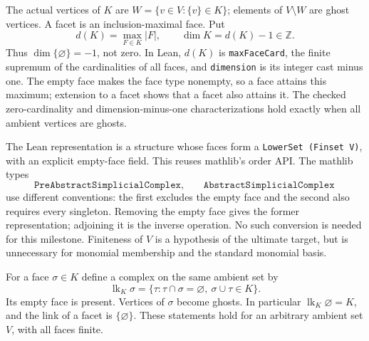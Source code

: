 \begin{definition}\label{def:dimension}
\leanok
The actual vertices of $K$ are
$W=\{v\in V:\{v\}\in K\}$; elements of $V\setminus W$ are ghost vertices.
A facet is an inclusion-maximal face. Put
\[
 d(K)=\max_{F\in K}|F|,\qquad \dim K=d(K)-1\in\mathbb Z.
\]
Thus $\dim\{\varnothing\}=-1$, not zero.
In Lean, $d(K)$ is \texttt{maxFaceCard}, the finite supremum of the
cardinalities of all faces, and \texttt{dimension} is its integer cast
minus one. The empty face makes the face type nonempty, so a face attains
this maximum; extension to a facet shows that a facet also attains it.
The checked zero-cardinality and dimension-minus-one characterizations
hold exactly when all ambient vertices are ghosts.
\end{definition}

The Lean representation is a structure whose faces form a
\texttt{LowerSet (Finset V)}, with an explicit empty-face field. This reuses
mathlib's order API. The mathlib types
\[
\texttt{PreAbstractSimplicialComplex},\qquad\texttt{AbstractSimplicialComplex}
\]
use different conventions: the first excludes the empty face and the second
also requires every singleton. Removing the empty face
gives the former representation; adjoining it is the inverse operation.
No such conversion is needed for this milestone. Finiteness of $V$ is a
hypothesis of the ultimate target, but is unnecessary for monomial membership
and the standard monomial basis.

\begin{definition}[Links]\label{def:link}
\leanok
For a face $\sigma\in K$ define a complex on the same ambient set by
\[
 \operatorname{lk}_K\sigma
 =\{\tau:\tau\cap\sigma=\varnothing,\ \sigma\cup\tau\in K\}.
\]
Its empty face is present. Vertices of $\sigma$ become ghosts.
In particular $\operatorname{lk}_K\varnothing=K$, and the link of a facet
is $\{\varnothing\}$. These statements hold for an arbitrary ambient set
$V$, with all faces finite.
\end{definition}

